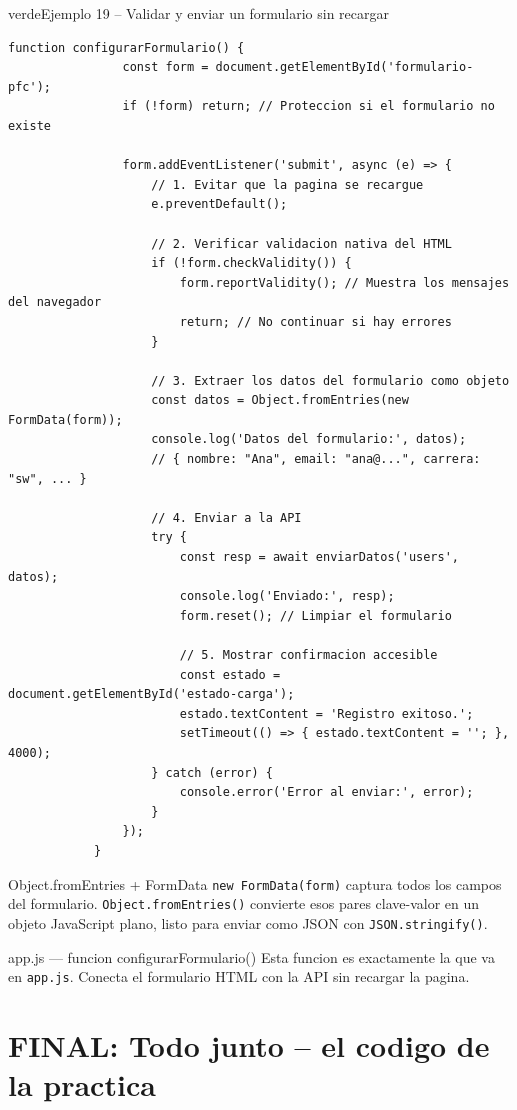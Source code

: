 \documentclass[11pt,a4paper]{article}
\begin{document}
	\begin{cajacodigo}{verde}{Ejemplo 19 -- Validar y enviar un formulario sin recargar}
		\begin{lstlisting}[style=codejs]
			function configurarFormulario() {
				const form = document.getElementById('formulario-pfc');
				if (!form) return; // Proteccion si el formulario no existe
				
				form.addEventListener('submit', async (e) => {
					// 1. Evitar que la pagina se recargue
					e.preventDefault();
					
					// 2. Verificar validacion nativa del HTML
					if (!form.checkValidity()) {
						form.reportValidity(); // Muestra los mensajes del navegador
						return; // No continuar si hay errores
					}
					
					// 3. Extraer los datos del formulario como objeto
					const datos = Object.fromEntries(new FormData(form));
					console.log('Datos del formulario:', datos);
					// { nombre: "Ana", email: "ana@...", carrera: "sw", ... }
					
					// 4. Enviar a la API
					try {
						const resp = await enviarDatos('users', datos);
						console.log('Enviado:', resp);
						form.reset(); // Limpiar el formulario
						
						// 5. Mostrar confirmacion accesible
						const estado = document.getElementById('estado-carga');
						estado.textContent = 'Registro exitoso.';
						setTimeout(() => { estado.textContent = ''; }, 4000);
					} catch (error) {
						console.error('Error al enviar:', error);
					}
				});
			}
		\end{lstlisting}
	\end{cajacodigo}
	
	\begin{cajaconcepto}{Object.fromEntries + FormData}
		\texttt{new FormData(form)} captura todos los campos del formulario. \texttt{Object.fromEntries()} convierte esos pares clave-valor en un objeto JavaScript plano, listo para enviar como JSON con \texttt{JSON.stringify()}.
	\end{cajaconcepto}
	
	\begin{cajapractica}{app.js --- funcion configurarFormulario()}
		Esta funcion es exactamente la que va en \texttt{app.js}. Conecta el formulario HTML con la API sin recargar la pagina.
	\end{cajapractica}
	
	\section{FINAL: Todo junto -- el codigo de la practica}
	
\end{document}

